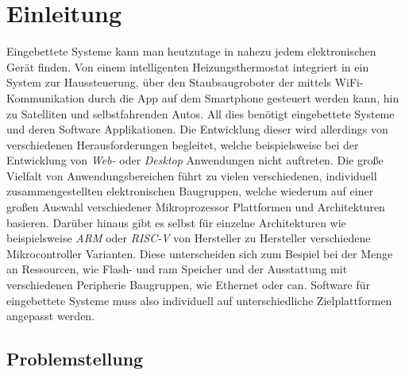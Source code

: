 
\chapter{Einleitung}

Eingebettete Systeme kann man heutzutage in nahezu jedem elektronischen Gerät
finden.
Von einem intelligenten Heizungsthermostat integriert in ein System zur
Haussteuerung, über den Staubsaugroboter der mittels WiFi-Kommunikation durch
die App auf dem Smartphone gesteuert werden kann, hin zu Satelliten und
selbstfahrenden Autos.
All dies benötigt eingebettete Systeme und deren Software Applikationen.
Die Entwicklung dieser wird allerdings von verschiedenen Herausforderungen
begleitet, welche beispielsweise bei der Entwicklung von \textit{Web-} oder
\textit{Desktop} Anwendungen nicht auftreten. \newline
Die große Vielfalt von Anwendungsbereichen führt zu vielen verschiedenen,
individuell zusammengestellten elektronischen Baugruppen, welche wiederum auf
einer großen Auswahl verschiedener Mikroprozessor Plattformen und Architekturen
basieren. \newline
Darüber hinaus gibt es selbst für einzelne Architekturen wie beispielsweise
\textit{ARM} oder \textit{RISC-V} von Hersteller zu Hersteller verschiedene
Mikrocontroller Varianten.
Diese unterscheiden sich zum Bespiel bei der Menge an Ressourcen, wie
Flash- und \ac{ram} Speicher und der Ausstattung mit verschiedenen Peripherie
Baugruppen, wie Ethernet oder \ac{can}. \newline
Software für eingebettete Systeme muss also individuell auf unterschiedliche
Zielplattformen angepasst werden.

\section{Problemstellung}

